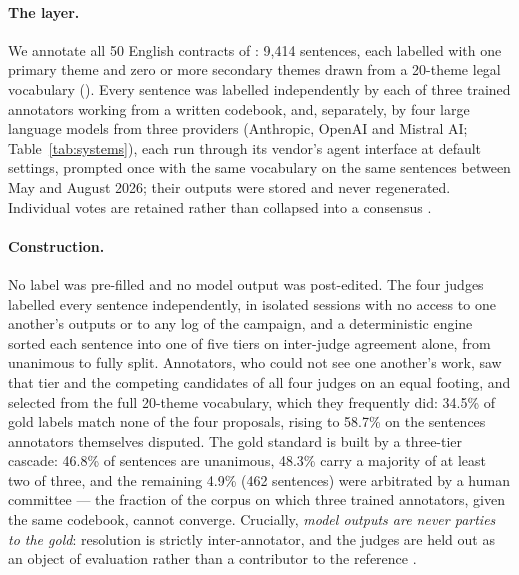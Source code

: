 \paragraph{The layer.}
We annotate all 50 English contracts of \corpus{} \cite{lippi2019claudette}:
9,414 sentences, each labelled with one primary theme and zero or more secondary
themes drawn from a 20-theme legal vocabulary (). Every sentence was
labelled independently by each of three trained
annotators working from a written codebook, and, separately, by four large
language models from three providers (Anthropic, OpenAI and Mistral AI;
Table~\ref{tab:systems}), each run through its vendor's agent interface at default
settings, prompted once with the same vocabulary on the same sentences between
May and August 2026; their outputs were stored and never regenerated. Individual votes are retained rather than collapsed into a
consensus \cite{braun2024differ,plank2022variation,uma2021disagreement}.

\paragraph{Construction.}
No label was pre-filled and no model output was post-edited. The four judges labelled
every sentence independently, in isolated sessions with no access to one another's
outputs or to any log of the campaign, and a deterministic engine sorted each sentence into
one of five tiers on inter-judge agreement alone, from unanimous to fully split.
Annotators, who could not see one another's work, saw that tier and the competing
candidates of all four judges on an equal footing, and selected from the full
20-theme vocabulary, which they frequently did:
34.5\% of gold labels match none of the four proposals, rising to 58.7\% on the
sentences annotators themselves disputed. The
gold standard is built by a three-tier cascade: 46.8\% of sentences are unanimous,
48.3\% carry a majority of at least two of three, and the remaining 4.9\%
(462 sentences) were arbitrated by a human committee --- the fraction of the
corpus on which three trained annotators, given the same codebook, cannot
converge. Crucially,
\emph{model outputs are never parties to the gold}: resolution is strictly
inter-annotator, and the judges are held out as an object of evaluation rather
than a contributor to the reference \cite{thalken2023legal}.


